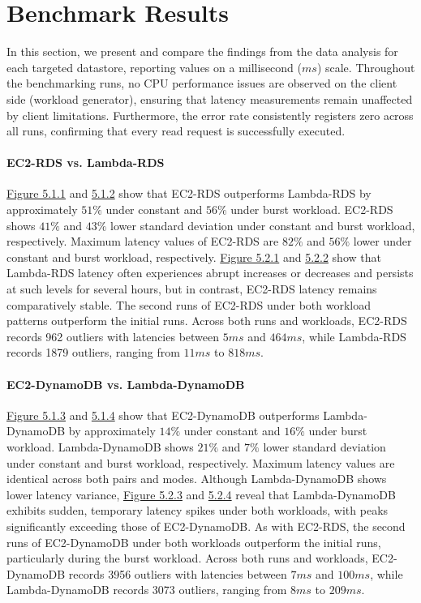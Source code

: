 \section{Benchmark Results}
\label{cha:results}

In this section, we present and compare the findings from the data analysis for each targeted datastore, reporting values on a millisecond ($ms$) scale. Throughout the benchmarking runs, no CPU performance issues are observed on the client side (workload generator), ensuring that latency measurements remain unaffected by client limitations. Furthermore, the error rate consistently registers zero across all runs, confirming that every read request is successfully executed.

\paragraph*{EC2-RDS vs. Lambda-RDS}
\hyperref[fig:bar_rds_const]{Figure 5.1.1} and \hyperref[fig:bar_rds_bursty]{5.1.2} show that EC2-RDS outperforms Lambda-RDS by approximately $51\%$ under constant and $56\%$ under burst workload. EC2-RDS shows $41\%$ and $43\%$ lower standard deviation under constant and burst workload, respectively. Maximum latency values of EC2-RDS are $82\%$ and $56\%$ lower under constant and burst workload, respectively.
%
\hyperref[fig:ts_rds_const]{Figure 5.2.1} and \hyperref[fig:ts_rds_bursty]{5.2.2} show that Lambda-RDS latency often experiences abrupt increases or decreases and persists at such levels for several hours, but in contrast, EC2-RDS latency remains comparatively stable. The second runs of EC2-RDS under both workload patterns outperform the initial runs.
%
Across both runs and workloads, EC2-RDS records 962 outliers with latencies between $5ms$ and $464ms$, while Lambda-RDS records 1879 outliers, ranging from $11ms$ to $818ms$.


\paragraph*{EC2-DynamoDB vs. Lambda-DynamoDB}
\hyperref[fig:bar_ddb_const]{Figure 5.1.3} and \hyperref[fig:bar_ddb_bursty]{5.1.4} show that EC2-DynamoDB outperforms Lambda-DynamoDB by approximately $14\%$ under constant and $16\%$ under burst workload. Lambda-DynamoDB shows $21\%$ and $7\%$ lower standard deviation under constant and burst workload, respectively. Maximum latency values are identical across both pairs and modes.
%
Although Lambda-DynamoDB shows lower latency variance, \hyperref[fig:ts_ddb_const]{Figure 5.2.3} and \hyperref[fig:ts_ddb_bursty]{5.2.4} reveal that Lambda-DynamoDB exhibits sudden, temporary latency spikes under both workloads, with peaks significantly exceeding those of EC2-DynamoDB. As with EC2-RDS, the second runs of EC2-DynamoDB under both workloads outperform the initial runs, particularly during the burst workload.
%
Across both runs and workloads, EC2-DynamoDB records 3956 outliers with latencies between $7ms$ and $100ms$, while Lambda-DynamoDB records 3073 outliers, ranging from $8ms$ to $209ms$.

